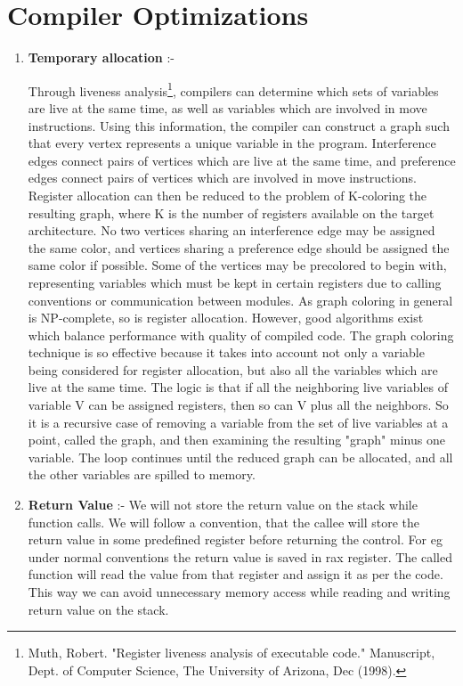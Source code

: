 \documentclass{sigchi}
\begin{document}
\section {Compiler Optimizations}
\begin{enumerate}
\item {\bf Temporary allocation} :-

Through liveness analysis\footnote{Muth, Robert. "Register liveness analysis of executable code." Manuscript, Dept. of Computer Science, The University of Arizona, Dec (1998).}, compilers can determine which sets of variables are live at the same time, as well as variables which are involved in move instructions. Using this information, the compiler can construct a graph such that every vertex represents a unique variable in the program. Interference edges connect pairs of vertices which are live at the same time, and preference edges connect pairs of vertices which are involved in move instructions. Register allocation can then be reduced to the problem of K-coloring the resulting graph, where K is the number of registers available on the target architecture. No two vertices sharing an interference edge may be assigned the same color, and vertices sharing a preference edge should be assigned the same color if possible. Some of the vertices may be precolored to begin with, representing variables which must be kept in certain registers due to calling conventions or communication between modules. 
As graph coloring in general is NP-complete, so is register allocation. However, good algorithms exist which balance performance with quality of compiled code.    The graph coloring technique is so effective because it takes into account not only a variable being considered for register allocation, but also all the variables which are live at the same time. The logic is that if all the neighboring live variables of variable V can be assigned registers, then so can V plus all the neighbors. So it is a recursive case of removing a variable from the set of live variables at a point, called the graph, and then examining the resulting "graph" minus one variable. The loop continues until the reduced graph can be allocated, and all the other variables are spilled to memory.

\item {\bf Return Value} :-
We will not store the return value on the stack while function calls. We will follow a convention, that the callee will store the return value in some predefined register before returning the control. For eg under normal conventions the return value is saved in rax register. The called function will read the value from that register and assign it as per the code. This way we can avoid unnecessary memory access while reading and writing return value on the stack.



\end{enumerate}
\end{document}
